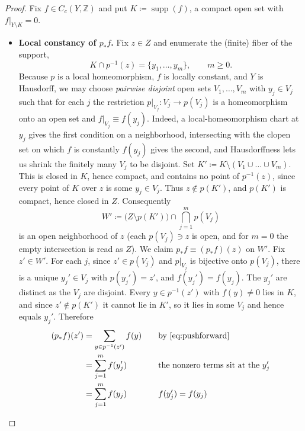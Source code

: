 \documentclass{extracta-temp-26}
\numberwithin{equation}{section}
\theoremstyle{definition}
\theoremstyle{remark}
\newcommand{\Z}{\mathbb{Z}}
\newcommand{\restr}[2]{#1\rvert_{#2}}
\DeclareMathOperator{\supp}{supp}
\newcommand{\step}[1]{\textbf{#1}}
\begin{document}
\begin{proof}
Fix \(f\in C_c(Y,\Z)\) and put \(K\coloneqq\supp(f)\), a compact open set with \(\restr{f}{Y\setminus K}=0\).
\begin{itemize}
\item \step{Local constancy of \(p_*f\).}
Fix \(z\in Z\) and enumerate the (finite) fiber of the support,
\begin{equation}\label{eq:fiber-enum}
K\cap p^{-1}(z)=\{y_1,\dots,y_m\},\qquad m\ge 0.
\end{equation}
Because \(p\) is a local homeomorphism, \(f\) is locally constant, and \(Y\) is Hausdorff, we may choose \emph{pairwise disjoint} open sets \(V_1,\dots,V_m\) with \(y_j\in V_j\) such that for each \(j\) the restriction \(\restr{p}{V_j}\colon V_j\to p(V_j)\) is a homeomorphism onto an open set and \(\restr{f}{V_j}\equiv f(y_j)\).
Indeed, a local-homeomorphism chart at \(y_j\) gives the first condition on a neighborhood, intersecting with the clopen set on which \(f\) is constantly \(f(y_j)\) gives the second, and Hausdorffness lets us shrink the finitely many \(V_j\) to be disjoint.
Set \(K'\coloneqq K\setminus(V_1\cup\dots\cup V_m)\).
This is closed in \(K\), hence compact, and contains no point of \(p^{-1}(z)\), since every point of \(K\) over \(z\) is some \(y_j\in V_j\).
Thus \(z\notin p(K')\), and \(p(K')\) is compact, hence closed in \(Z\).
Consequently
\begin{equation}\label{eq:Wprime}
W'\coloneqq\bigl(Z\setminus p(K')\bigr)\cap\bigcap_{j=1}^m p(V_j)
\end{equation}
is an open neighborhood of \(z\) (each \(p(V_j)\ni z\) is open, and for \(m=0\) the empty intersection is read as \(Z\)).
We claim \(p_*f\equiv(p_*f)(z)\) on \(W'\).
Fix \(z'\in W'\).
For each \(j\), since \(z'\in p(V_j)\) and \(\restr{p}{V_j}\) is bijective onto \(p(V_j)\), there is a unique \(y_j'\in V_j\) with \(p(y_j')=z'\), and \(f(y_j')=f(y_j)\).
The \(y_j'\) are distinct as the \(V_j\) are disjoint.
Every \(y\in p^{-1}(z')\) with \(f(y)\neq0\) lies in \(K\), and since \(z'\notin p(K')\) it cannot lie in \(K'\), so it lies in some \(V_j\) and hence equals \(y_j'\).
Therefore
\begin{equation}\label{eq:pf-locally-constant}
\begin{aligned}
(p_*f)(z')
&=\sum_{y\in p^{-1}(z')}f(y)&&\quad\text{by \eqref{eq:pushforward}}\\
&=\sum_{j=1}^m f(y_j')&&\quad\text{the nonzero terms sit at the \(y_j'\)}\\
&=\sum_{j=1}^m f(y_j)&&\quad\text{\(f(y_j')=f(y_j)\)}\\

\end{aligned}
\end{equation}
\end{itemize}
\end{proof}
\end{document}
